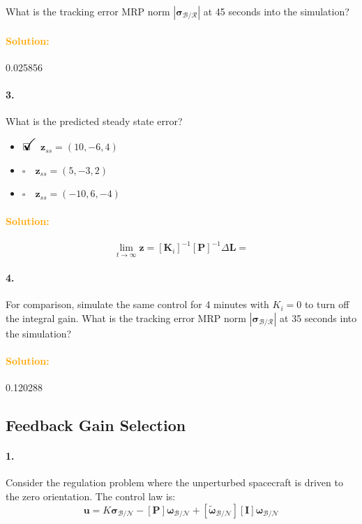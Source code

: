 \documentclass[12pt, a4paper]{article}
\newcommand{\ans}{\item[]$\rlap{\LARGE{\checkmark}}\square\quad$}
\newcommand{\noans}{\item[]$\square\quad$}
\begin{document}
What is the tracking error MRP norm $|\bm{\sigma}_{\mathcal{B}/\mathcal{R}}|$ at 45 seconds into the simulation?

\paragraph{\textcolor{orange}{Solution:}}0.025856

\paragraph{3.}
What is the predicted steady state error?

\begin{itemize}
\ans $\bm{z}_{ss} = (10,-6,4)$
\noans $\bm{z}_{ss} = (5,-3,2)$
\noans $\bm{z}_{ss} = (-10,6,-4)$
\end{itemize}

\paragraph{\textcolor{orange}{Solution:}}

$$
\lim_{t\rightarrow\infty}\bm{z} = [\bm{K}_{i}]^{-1}[\bm{P}]^{-1}\Delta\bm{L} = 
$$

\paragraph{4.}
For comparison, simulate the same control for 4 minutes with $K_{i} = 0$ to turn off the integral gain. What is the tracking error MRP norm $|\bm{\sigma}_{\mathcal{B}/\mathcal{R}}|$ at 35 seconds into the simulation?

\paragraph{\textcolor{orange}{Solution:}}0.120288

\newpage
\subsection{Feedback Gain Selection}
\paragraph{1.}
Consider the regulation problem where the unperturbed
spacecraft is driven to the zero orientation. 
The control law is:
$$\bm{u} = K\bm{\sigma}_{\mathcal{B}/\mathcal{N}} - [\bm{P}]\bm{\omega}_{\mathcal{B}/\mathcal{N}} + [\tilde{\bm{\omega}}_{\mathcal{B}/\mathcal{N}}][\bm{I}]\bm{\omega}_{\mathcal{B}/\mathcal{N}}$$
\end{document}
